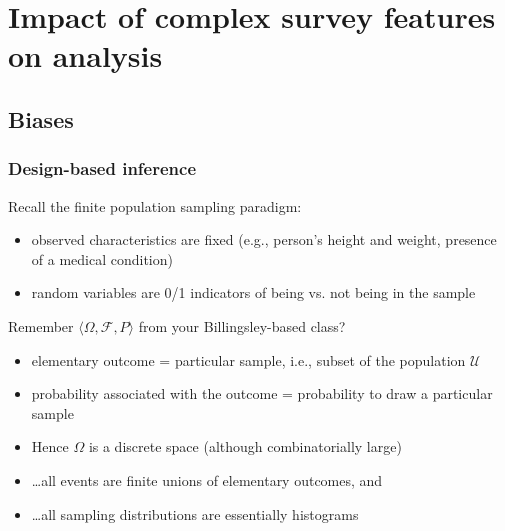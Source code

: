 \documentclass{beamer}
\begin{document}
\section{Impact of complex survey features on analysis}

\subsection{Biases}

\begin{frame}\frametitle{Design-based inference}

Recall the finite population sampling paradigm:
\begin{itemize}
    \item observed characteristics are fixed (e.g., person's height and weight, presence of a medical condition)
    \item random variables are 0/1 indicators of being vs. not being in the sample
\end{itemize}

Remember $\langle \Omega, \mathcal{F}, P \rangle$ from your Billingsley-based class?
\begin{itemize}
    \item elementary outcome = particular sample, i.e., subset of the population $\mathcal U$
    \item probability associated with the outcome = probability to draw a particular sample
    \item Hence $\Omega$ is a discrete space (although combinatorially large)
    \item \ldots all events are finite unions of elementary outcomes, and
    \item \ldots all sampling distributions are essentially histograms
\end{itemize}

\end{frame}
\end{document}
